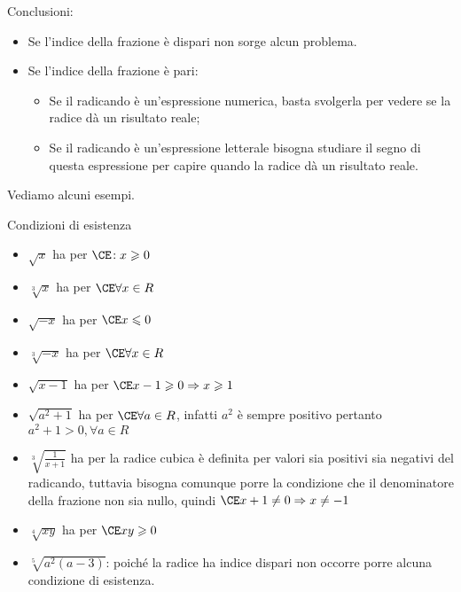 Conclusioni:
\begin{itemize} [noitemsep]
\item Se l'indice della frazione è dispari non sorge alcun problema.
\item Se l'indice della frazione è pari:
\begin{itemize} [noitemsep]
\item Se il radicando è un'espressione numerica, basta svolgerla per 
vedere se la radice dà un risultato reale;
\item Se il radicando è un'espressione letterale bisogna studiare il segno 
di questa espressione per capire quando la radice dà un risultato reale.
\end{itemize}
\end{itemize}

Vediamo alcuni esempi.

% 
\begin{esempio}{}{}
Condizioni di esistenza
\begin{itemize}
\item \(\sqrt x\) \quad ha per \(\CE\!: x\geqslant 0\)
\item \(\sqrt[3]x\) \quad ha per \(\CE \forall x\in R\)
\item \(\sqrt{-x}\) \quad ha per \(\CE x\leqslant 0\)
\item \(\sqrt[3]{-x}\) \quad ha per \(\CE \forall x\in R\)
\item \(\sqrt{x-1}\) \quad ha per \(\CE x-1\geqslant 0 \Rightarrow 
x\geqslant 1\)
\item \(\sqrt{a^2+1}\) \quad ha per \(\CE \forall a\in R\), infatti 
\(a^2\) è sempre positivo pertanto \(a^2+1>0, \forall a\in R\)
\item \(\sqrt[3]{\frac 1{x+1}}\) \quad ha per la radice cubica è definita 
per valori sia positivi sia negativi del radicando, tuttavia bisogna 
comunque porre la condizione che il denominatore della frazione non sia 
nullo, quindi \(\CE x+1\neq 0 \Rightarrow x\neq -1\)
\item \(\sqrt[4]{xy}\) \quad ha per \(\CE xy\geqslant 0\)
\item \(\sqrt[5]{a^2(a-3)}\): poiché la radice ha indice dispari non occorre 
  porre alcuna condizione di esistenza.
\end{itemize}
\end{esempio}


